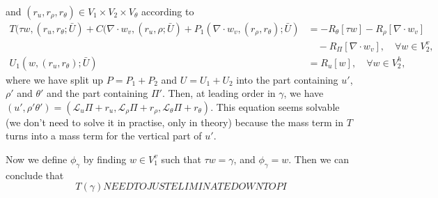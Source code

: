 \documentclass{article}
\begin{document}
and $(r_u,r_\rho,r_\theta)\in V_1\times V_2 \times V_\theta$ according to
\begin{align}
  \nonumber
T(\tau w,(r_u,r_\theta; \bar{U})
+C(\nabla \cdot w_v,(r_u,\rho; \bar{U})
+P_1(\nabla\cdot w_v,(r_\rho,r_\theta); \bar{U})
 & = 
- R_\theta[\tau w] - R_\rho[\nabla\cdot w_v] \\
& \quad - R_\Pi[\nabla\cdot w_v], \quad \forall w\in V_2^v, \\ 
  U_1(w, (r_u,r_\theta); \bar{U}) & = R_u[w], \quad \forall w\in
  V_2^h,
\end{align}
where we have split up $P=P_1+P_2$ and $U=U_1+U_2$ into the part
containing $u'$, $\rho'$ and $\theta'$ and the part containing $\Pi'$.
Then, at leading order in $\gamma$, we have $(u',\rho'\theta')=
(\mathcal{L}_u\Pi+r_u,\mathcal{L}_\rho\Pi+r_\rho,\mathcal{L}_\theta\Pi+r_\theta)$.
This equation seems solvable (we don't need to solve it in practise, only in
theory) because the mass term in $T$ turns into a mass term for the
vertical part of $u'$.

Now we define $\phi_\gamma$ by finding $w\in V_1^v$ such that
$\tau w=\gamma$, and $\phi_\gamma = w$. Then we can conclude that
\begin{equation}
  T(\gamma) NEED TO JUST ELIMINATE DOWN TO PI
\end{equation}
\end{document}
